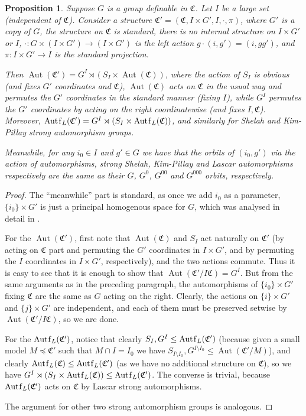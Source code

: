 \documentclass[final,a4paper,12pt]{amsart}
\newcommand{\fC}{{\mathfrak C}}
\DeclareMathOperator{\Aut}{{Aut}}
\DeclareMathOperator{\Autf}{{Aut\mkern 0.5\thinmuskip f}}
\newtheorem{prop}[thm]{Proposition}
\theoremstyle{remark}
\theoremstyle{definition}
\begin{document}
	\begin{prop}
		Suppose $G$ is a group definable in $\fC$. Let $I$ be a large set (independent of $\fC$). Consider a structure $\fC'=(\fC,I\times G',I,\cdot,\pi)$, where $G'$ is a copy of $G$, the structure on $\fC$ is standard, there is no internal structure on $I\times G'$ or $I$, $\cdot\colon G\times (I\times G')\to (I\times G')$ is the left action $g\cdot(i,g')=(i,gg')$, and $\pi\colon I\times G'\to I$ is the standard projection.
		
		Then $\Aut(\fC')=G^I\rtimes(S_I\times \Aut(\fC))$, where the action of $S_I$ is obvious (and fixes $G'$ coordinates and $\fC$), $\Aut(\fC)$ acts on $\fC$ in the usual way and permutes the $G'$ coordinates in the standard manner (fixing $I$), while $G^I$ permutes the $G'$ coordinates by acting on the right coordinatewise (and fixes $I,\fC$). Moreover, $\Autf_L(\fC')=G^I\rtimes(S_I\times \Autf_L(\fC))$, and similarly for Shelah and Kim-Pillay strong automorphism groups.
		
		Meanwhile, for any $i_0\in I$ and $g'\in G$ we have that the orbits of $(i_0,g')$ via the action of automorphisms, strong Shelah, Kim-Pillay and Lascar automorphisms respectively are the same as their $G$, $G^0$, $G^{00}$ and $G^{000}$ orbits, respectively. 
	\end{prop}
	\begin{proof}
		The ``meanwhile'' part is standard, as once we add $i_0$ as a parameter, $\{i_0\}\times G'$ is just a principal homogenous space for $G$, which was analysed in detail in \cite{GN08}.
		
		For the $\Aut(\fC')$, first note that $\Aut(\fC)$ and $S_I$ act naturally on $\fC'$ (by acting on $\fC$ part and permuting the $G'$ coordinates in $I\times G'$, and by permuting the $I$ coordinates in $I\times G'$, respectively), and the two actions commute. Thus it is easy to see that it is enough to show that $\Aut(\fC'/I\fC)= G^I$. But from the same arguments as in the preceding paragraph, the automorphisms of $\{i_0\}\times G'$ fixing $\fC$ are the same as $G$ acting on the right. Clearly, the actions on $\{i\}\times G'$ and $\{j\}\times G'$ are independent, and each of them must be preserved setwise by $\Aut(\fC'/I\fC)$, so we are done.
		
		For the $\Autf_L(\fC')$, notice that clearly $S_I, G^I\leq \Autf_L(\fC')$ (because given a small model $M\preceq \fC'$ such that $M\cap I=I_0$ we have $S_{I\setminus I_0},G^{I\setminus I_0}\leq \Aut(\fC'/M)$), and clearly $\Autf_L(\fC)\leq \Autf_L(\fC')$ (as we have no additional structure on $\fC$), so we have $G^I\rtimes(S_I\times \Autf_L(\fC))\leq \Autf_L(\fC')$. The converse is trivial, because $\Autf_L(\fC')$ acts on $\fC$ by Lascar strong automorphisms.
		
		The argument for other two strong automorphism groups is analogous.
	\end{proof}
	
\end{document}
